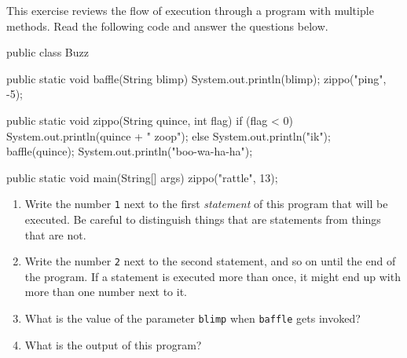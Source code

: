 \begin{exercise}

This exercise reviews the flow of execution through a program
with multiple methods.  Read the following code and answer the
questions below.

\begin{code}
public class Buzz {

    public static void baffle(String blimp) {
        System.out.println(blimp);
        zippo("ping", -5);
    }

    public static void zippo(String quince, int flag) {
        if (flag < 0) {
            System.out.println(quince + " zoop");
        } else {
            System.out.println("ik");
            baffle(quince);
            System.out.println("boo-wa-ha-ha");
        }
    }

    public static void main(String[] args) {
        zippo("rattle", 13);
    }
}
\end{code}

\begin{enumerate}

\item Write the number {\tt 1} next to the first {\em statement}
of this program that will be executed.  Be careful to distinguish
things that are statements from things that are not.

\item Write the number {\tt 2} next to the second statement, and so on
until the end of the program.  If a statement is executed more than
once, it might end up with more than one number next to it.

\item What is the value of the parameter {\tt blimp} when {\tt baffle}
gets invoked?

\item What is the output of this program?

\end{enumerate}
\end{exercise}


